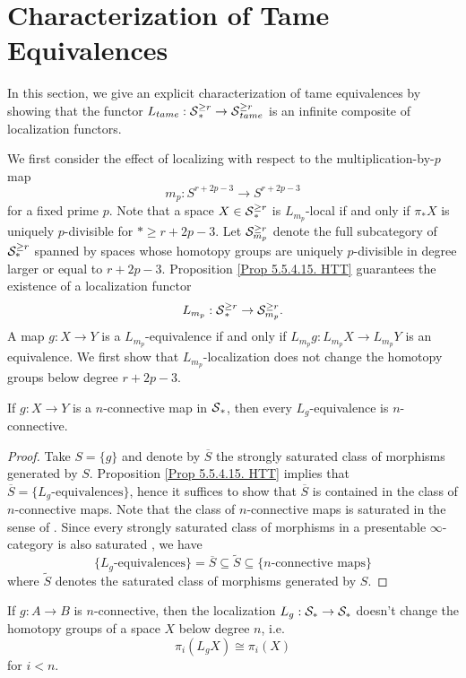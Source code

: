 \section{Characterization of Tame Equivalences}
\label{Section: Characterization of Tame Equivalences}
In this section, we give an explicit characterization of tame equivalences by showing that the functor $L_{tame}:\operatorname{\mathcal{S}}^{\geq r}_* \to \operatorname{\mathcal{S}}^{\geq r}_{tame}$ is an infinite composite of localization functors.

We first consider the effect of localizing with respect to the multiplication-by-$p$ map $$
m_p:S^{r+2p-3}\to S^{r+2p-3}$$ for a fixed prime $p$. 
Note that a space $X\in \operatorname{\mathcal{S}}^{\geq r}_*$ is $L_{m_p}$-local if and only if $\pi_{*}X$ is uniquely $p$-divisible for $* \geq r+2p-3$.
Let ${\mathcal{S}}^{\geq r}_{m_p}$ denote the full subcategory of ${\mathcal{S}}^{\geq r}_*$ spanned by spaces whose homotopy groups are uniquely $p$-divisible in degree larger or equal to $r+2p-3$.
Proposition \ref{Prop 5.5.4.15. HTT} guarantees the existence of a localization functor
\[
L_{m_p}:\operatorname{\mathcal{S}}^{\geq r}_{*} \to {\mathcal{S}}^{\geq r}_{m_p}.
\]
A map $g:X\to Y$ is a $L_{m_p}$-equivalence if and only if 
$L_{m_p}g: L_{m_p}X \to L_{m_p}Y$ is an equivalence.
We first show that $L_{m_p}$-localization does not change the homotopy groups below degree $r+2p-3$. 
\begin{proposition}
\label{connectivity of local equivalences of spaces}
	If $g: X\to Y$ is a $n$-connective map in $\operatorname{\mathcal{S}}_*$, then every $L_g$-equivalence is $n$-connective.
\end{proposition}
\begin{proof}
	Take $S=\{g\}$ and denote by $\overline{S}$ the strongly saturated class of morphisms generated by $S$. Proposition \ref{Prop 5.5.4.15. HTT} implies that  $\overline{S}= \{L_g\text{-equivalences}\}$, hence it suffices to show that $\overline{S}$ is contained in the class of $n$-connective maps. Note that the class of $n$-connective maps is saturated in the sense of \cite[Definition 5.5.5.1]{HTT}. Since every strongly saturated class of morphisms in a presentable $\infty$-category is also saturated \cite[Example 5.5.5.5.]{HTT}, we have 
	$$
	\{L_g\text{-equivalences}\}=\overline{S} \subseteq \tilde{S} \subseteq \{n\text{-connective maps}\}
	$$
	where $\tilde{S}$ denotes the saturated class of morphisms generated by $S$.
\end{proof}

\begin{corollary}
\label{L_g doesn't change lower hpty groups if g is n-conn}
        If $g:A\to B$ is $n$-connective, then  the localization $L_g:{\mathcal{S}}_*\to {\mathcal{S}}_*$ doesn't change the homotopy groups of a space $X$ below degree $n$, i.e. 
	\[
	\pi_{i}(L_gX) \cong \pi_i(X)
	\]
	for $i< n$.
\end{corollary}

